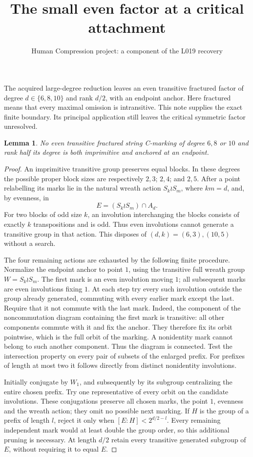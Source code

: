 \documentclass[11pt,a4paper]{article}
\title{The small even factor at a critical attachment}
\author{Human Compression project: a component of the L019 recovery}
\date{}
\newtheorem{lemma}{Lemma}
\begin{document}
\maketitle
The acquired large-degree reduction leaves an even transitive fractured
factor of degree $d\in\{6,8,10\}$ and rank $d/2$, with an endpoint
anchor. Here fractured means that every maximal omission is intransitive.
This note supplies the exact finite boundary. Its principal application
still leaves the critical symmetric factor unresolved.

\begin{lemma}\label{imprimitive}
No even transitive fractured string C-marking of degree $6,8$ or $10$
and rank half its degree is both imprimitive and anchored at an endpoint.
\end{lemma}
\begin{proof}
An imprimitive transitive group preserves equal blocks. In these degrees
the possible proper block sizes are respectively $2,3$; $2,4$; and
$2,5$. After a point relabelling its marks lie in the natural wreath
action $S_k\wr S_m$, where $km=d$, and, by evenness, in
\[
                       E=(S_k\wr S_m)\cap A_d.
\]
For two blocks of odd size $k$, an involution interchanging the blocks
consists of exactly $k$ transpositions and is odd. Thus even involutions
cannot generate a transitive group in that action. This disposes of
$(d,k)=(6,3),(10,5)$ without a search.

The four remaining actions are exhausted by the following finite
procedure. Normalize the endpoint anchor to point $1$, using the
transitive full wreath group $W=S_k\wr S_m$. The first mark is an
even involution moving $1$; all subsequent marks are even involutions
fixing $1$. At each step try every such involution outside the group
already generated, commuting with every earlier mark except the last.
Require that it not commute with the last mark. Indeed, the component
of the noncommutation diagram containing the first mark is transitive:
all other components commute with it and fix the anchor. They therefore
fix its orbit pointwise, which is the full orbit of the marking. A
nonidentity mark cannot belong to such another component. Thus the
diagram is connected. Test the intersection property on every pair
of subsets of the enlarged prefix. For prefixes of length at most two
it follows directly from distinct nonidentity involutions.

Initially conjugate by $W_1$, and subsequently by its subgroup
centralizing the entire chosen prefix. Try one representative of every
orbit on the candidate involutions. These conjugations preserve all
chosen marks, the point $1$, evenness and the wreath action; they omit
no possible next marking. If $H$ is the group of a prefix of length
$l$, reject it only when $[E:H]<2^{d/2-l}$. Every remaining independent
mark would at least double the group order, so this additional pruning
is necessary. At length $d/2$ retain every transitive generated subgroup
of $E$, without requiring it to equal $E$.


\end{proof}
\end{document}
